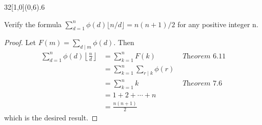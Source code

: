 \documentclass[12pt]{article}
\newenvironment{exercise}[2]{\begin{textblock}{32}[1,0](0,#2)\noindent#1\end{textblock}}{\vspace{1in}}
\begin{document}
\begin{exercise}{7.4.6}{6}
  {\noindent}Verify the formula $\sum_{d=1}^{n}{\phi(d)\lfloor n/d \rfloor} = n(n+1)/2$ for any positive integer n.

  \begin{proof}
    Let $F(m) = \sum\limits_{d \mid m} \phi(d)$. Then
    \begin{align*}
        \sum_{d=1}^n \phi(d) \left\lfloor \frac{n}{d} \right\rfloor &= \sum_{k=1}^n F(k)  & \textit{ Theorem 6.11}\\
        &= \sum_{k=1}^n \sum_{r \mid k} \phi(r) & \\
        &= \sum_{k=1}^n k  & \textit{ Theorem 7.6}\\
        &= 1 + 2 + \cdots + n & \\
        &= \frac{n(n+1)}{2} & 
    \end{align*}
    which is the desired result.
  \end{proof}
\end{exercise}
\end{document}
